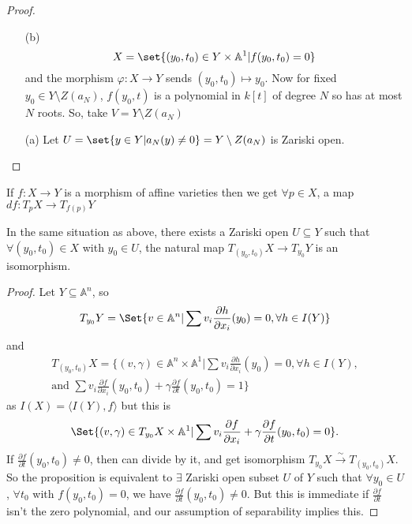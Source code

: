 \documentclass{article}
\newcommand{\A}{\mathbb{A}}
\begin{document}
\begin{proof}
    \leavevmode
    \begin{enumerate}
        \item[(b)]
            \begin{equation*}X = \set{(y_0, t_0) \in Y \times \A^1 | f(y_0, t_0) = 0}\end{equation*}
            and the morphism $\varphi: X \to Y$ sends $(y_0, t_0) \mapsto y_0$.
            Now for fixed $y_0 \in Y \setminus Z(a_N)$, $f(y_0, t)$ is a polynomial in $k[t]$ of degree $N$ so has at most $N$ roots.
            So, take $V = Y \setminus Z(a_N)$
        \item [(a)] Let $U = \set{y \in Y | a_N(y) \neq 0} = Y \setminus Z(a_N)$ is Zariski open. \qedhere
    \end{enumerate}
\end{proof}
\begin{ex}
    If $f: X \to Y$ is a morphism of affine varieties then we get $\forall p \in X$, a map $df: T_p X \to T_{f(p)} Y$
\end{ex}
\begin{prop}
    In the same situation as above, there exists a Zariski open $U \subseteq Y$ such that $\forall (y_0, t_0) \in X$ with $y_0 \in U$, the natural map $T_{(y_0, t_0)} X \to T_{y_0} Y$ is an isomorphism.
\end{prop}
\begin{proof}
    Let $Y \subseteq \A^n$, so
    \begin{equation*}T_{y_0} Y = \Set{v \in \A^n | \sum v_i \frac{\partial h}{\partial x_i}(y_0) = 0, \forall h \in I(Y)}\end{equation*}
    and
        \begin{multline*}
        T_{(y_0, t_0)} X = \bigg\{(v, \gamma) \in \A^n \times \A^1 \bigg| \sum v_i \frac{\partial h}{\partial x_i}(y_0) = 0, \forall h \in I(Y),\\ \text{and } \sum v_i \frac{\partial f}{\partial x_i} (y_0, t_0) + \gamma \frac{\partial f}{\partial t}(y_0, t_0) = 1\bigg\}
        \end{multline*}
    as $I(X) = \langle I(Y), f \rangle$ but this is
    \begin{equation*}
        \Set{(v, \gamma) \in T_{y_0} X \times \A^1 | \sum v_i \frac{\partial f}{\partial x_i} + \gamma \frac{\partial f}{\partial t}(y_0, t_0) = 0}.
    \end{equation*}
    If $\frac{\partial f}{\partial t}(y_0, t_0) \neq 0$, then can divide by it, and get isomorphism $T_{y_0} X \overset{\sim}{\rightarrow} T_{(y_0, t_0)} X$.
    So the proposition is equivalent to $\exists$ Zariski open subset $U$ of $Y$ such that $\forall y_0 \in U$, $\forall t_0$ with $f(y_0, t_0) = 0$, we have $\frac{\partial f}{\partial t}(y_0, t_0) \neq 0$.
    But this is immediate if $\frac{\partial f}{\partial t}$ isn't the zero polynomial, and our assumption of separability implies this.
\end{proof}
\end{document}
